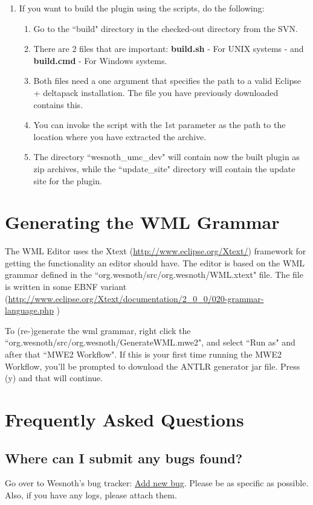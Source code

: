 \documentclass[10pt]{article}
\begin{document}
\begin{enumerate}
  \item If you want to build the plugin using the scripts, do the following:
  \begin{enumerate}
    \item Go to the ``build" directory in the checked-out directory from the SVN.
    \item There are 2 files that are important: \textbf{build.sh} - For UNIX systems - and \textbf{build.cmd} - For Windows systems.
    \item Both files need a one argument that specifies the path to a valid Eclipse + deltapack installation. The file you have previously downloaded contains this.
    \item You can invoke the script with the 1st parameter as the path to the location where you have extracted the archive.
    \item The directory ``wesnoth\_umc\_dev" will contain now the built plugin as zip archives, while the ``update\_site" directory will contain the update site for the plugin.
  \end{enumerate}
\end{enumerate}

\section{Generating the WML Grammar}
The WML Editor uses the Xtext (\href{http://www.eclipse.org/Xtext/}{http://www.eclipse.org/Xtext/}) framework for getting the functionality an editor should have. The editor is based on the WML grammar defined in the ``org.wesnoth/src/org.wesnoth/WML.xtext" file.
The file is written in some EBNF variant (\href{http://www.eclipse.org/Xtext/documentation/2\_0\_0/020-grammar-language.php}{http://www.eclipse.org/Xtext/documentation/2\_0\_0/020-grammar-language.php} )

To (re-)generate the wml grammar, right click the ``org.wesnoth/src/org.wesnoth/GenerateWML.mwe2", and select ``Run as" and after that ``MWE2 Workflow". If this is your first time running the MWE2 Workflow, you'll be prompted to download the ANTLR generator jar file. Press (y) and that will continue.

\section{Frequently Asked Questions}
\subsection{Where can I submit any bugs found?}
Go over to Wesnoth's bug tracker: \href{https://gna.org/bugs/?func=additem&group=wesnoth&bug_group_id=116}{Add new bug}. Please be as specific as possible. Also, if you have any logs, please attach them.
\end{document}
